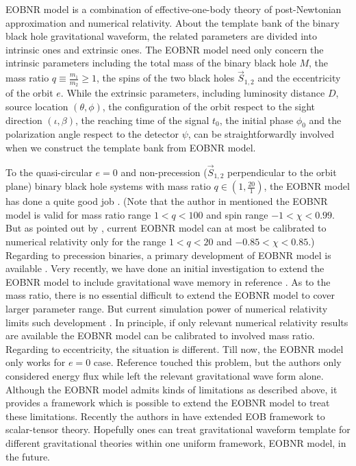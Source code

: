 \documentclass[prd,aps,a4paper,superscriptaddress,twocolumn,footinbib,showpacs]{revtex4}
\begin{document}
EOBNR model \cite{PhysRevD.76.104049} is a combination of effective-one-body theory of post-Newtonian approximation and numerical relativity. About the template bank of the binary black hole gravitational waveform, the related parameters are divided into intrinsic ones and extrinsic ones. The EOBNR model need only concern the intrinsic parameters including the total mass of the binary black hole $M$, the mass ratio $q\equiv\frac{m_1}{m_2}\geq1$, the spins of the two black holes $\vec{S}_{1,2}$ and the eccentricity of the orbit $e$. While the extrinsic parameters, including luminosity distance $D$, source location $(\theta,\phi)$, the configuration of the orbit respect to the sight direction $(\iota,\beta)$, the reaching time of the signal $t_0$, the initial phase $\phi_0$ and the polarization angle respect to the detector $\psi$, can be straightforwardly involved when we construct the template bank from EOBNR model.

To the quasi-circular $e=0$ and non-precession ($\vec{S}_{1,2}$ perpendicular to the orbit plane) binary black hole systems with mass ratio $q\in(1,\frac{20}{1})$, the EOBNR model has done a quite good job \cite{PhysRevD.89.061502}. (Note that the author in \cite{PhysRevD.93.064041} mentioned the EOBNR model is valid for mass ratio range $1<q<100$ and spin range $-1<\chi<0.99$. But as pointed out by \cite{PhysRevD.93.044006,PhysRevD.93.044007,chu2016accuracy,PhysRevD.93.104050}, current EOBNR model can at most be calibrated to numerical relativity only for the range $1<q<20$ and $-0.85<\chi<0.85$.) Regarding to precession binaries, a primary development of EOBNR model is available \cite{pan2014inspiral}. Very recently, we have done an initial investigation to extend the EOBNR model to include gravitational wave memory in reference \cite{Cao16}. As to the mass ratio, there is no essential difficult to extend the EOBNR model to cover larger parameter range. But current simulation power of numerical relativity limits such development \cite{PhysRevLett.106.041101}. In principle, if only relevant numerical relativity results are available the EOBNR model can be calibrated to involved mass ratio. Regarding to eccentricity, the situation is different. Till now, the EOBNR model only works for $e=0$ case. Reference \cite{PhysRevD.86.124012} touched this problem, but the authors only considered energy flux while left the relevant gravitational wave form alone. Although the EOBNR model admits kinds of limitations as described above, it provides a framework which is possible to extend the EOBNR model to treat these limitations. Recently the authors in \cite{julie2017two} have extended EOB framework to scalar-tensor theory. Hopefully ones can treat gravitational waveform template for different gravitational theories \cite{PhysRevD.94.084002} within one uniform framework, EOBNR model, in the future.
\end{document}

